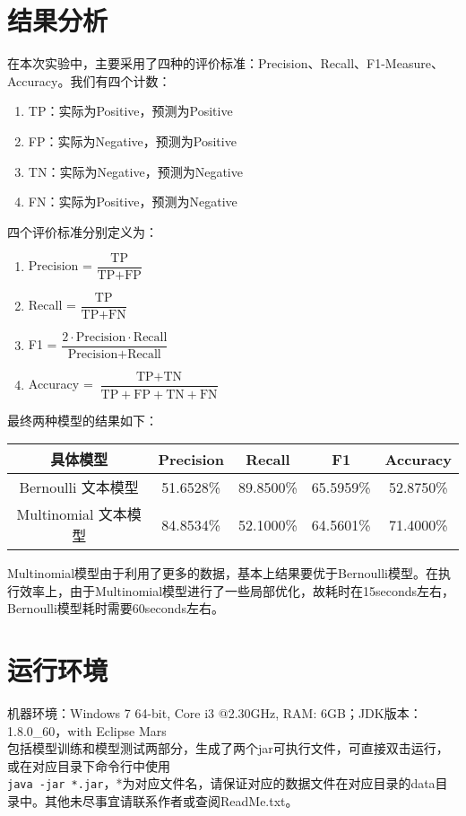 \documentclass[11pt]{article}
\begin{document}
\section{结果分析}
\hspace{1.6em} 在本次实验中，主要采用了四种的评价标准：Precision、Recall、F1-Measure、Accuracy。我们有四个计数：
\begin{enumerate}
  \item TP：实际为Positive，预测为Positive
  \item FP：实际为Negative，预测为Positive
  \item TN：实际为Negative，预测为Negative
  \item FN：实际为Positive，预测为Negative
\end{enumerate}
\hspace{1.6em} 四个评价标准分别定义为：
\begin{enumerate}
  \item Precision = $\dfrac{\text{TP}}{\text{TP}+\text{FP}}$
  \item Recall = $\dfrac{\text{TP}}{\text{TP}+\text{FN}}$
  \item F1 = $\dfrac{2 \cdot \text{Precision} \cdot \text{Recall}}{\text{Precision}+\text{Recall}}$
  \item Accuracy = $\dfrac{\text{TP}+\text{TN}}{\text{TP}+\text{FP}+\text{TN}+\text{FN}}$
\end{enumerate}
\hspace{1.6em} 最终两种模型的结果如下：
\begin{center}
\begin{tabular}{|c|c|c|c|c|}
  \hline
  具体模型 & Precision & Recall & F1 & Accuracy \\ \hline
  Bernoulli 文本模型 & 51.6528\% & 89.8500\% & 65.5959\% & 52.8750\% \\ \hline
  Multinomial 文本模型 & 84.8534\% & 52.1000\% & 64.5601\% & 71.4000\% \\
  \hline
\end{tabular}
\end{center}
\hspace{1.6em} Multinomial模型由于利用了更多的数据，基本上结果要优于Bernoulli模型。在执行效率上，由于Multinomial模型进行了一些局部优化，故耗时在15seconds左右，Bernoulli模型耗时需要60seconds左右。
\section{运行环境}
\hspace{1.6em} 机器环境：Windows 7 64-bit, Core i3 @2.30GHz, RAM: 6GB；JDK版本：1.8.0\_60，with Eclipse Mars \\
\indent 包括模型训练和模型测试两部分，生成了两个jar可执行文件，可直接双击运行，或在对应目录下命令行中使用\\
\indent \texttt{java -jar *.jar}，*为对应文件名，请保证对应的数据文件在对应目录的data目录中。其他未尽事宜请联系作者或查阅ReadMe.txt。
\end{document}
